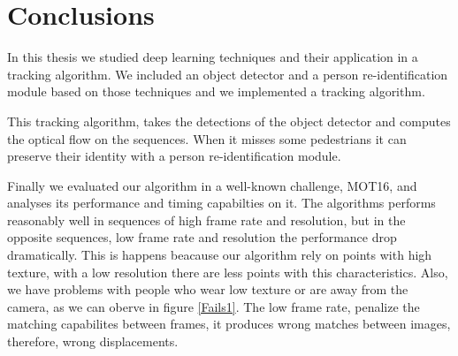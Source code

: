 \documentclass[12pt, a4paper, titlepage,twoside,openright]{article}
\begin{document}
\section{Conclusions}


In this thesis we studied deep learning techniques and their application in a tracking algorithm. We included an object detector and a person re-identification module based on those techniques and we implemented a tracking algorithm.

This tracking algorithm, takes the detections of the object detector and computes the optical flow on the sequences. When it misses some pedestrians it can preserve their identity with a person re-identification module.

Finally we evaluated our algorithm in a well-known challenge, MOT16, and analyses its performance and timing capabilties on it. The algorithms performs reasonably well in sequences of high frame rate and resolution, but in the opposite sequences, low frame rate and resolution the performance drop dramatically. This is happens beacause our algorithm rely on points with high texture, with a low resolution there are less points with this characteristics. Also, we have problems with people who wear low texture or are away from the camera, as we can oberve in figure \ref{Fails1}. The low frame rate, penalize the matching capabilites between frames, it produces wrong matches between images, therefore, wrong displacements.
\end{document}
